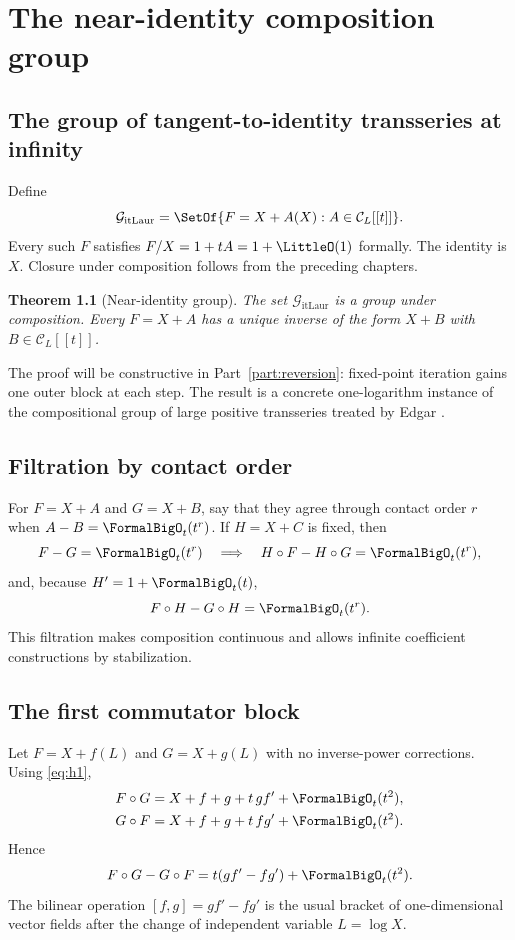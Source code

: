 \documentclass[11pt,oneside]{book}
\newtheorem{theorem}{Theorem}[chapter]
\theoremstyle{definition}
\theoremstyle{remark}
\newcommand{\compose}{\mathbin{\circ}}
\begin{document}
\chapter{The near-identity composition group}
\label{ch:composition-group}

\section{The group of tangent-to-identity transseries at infinity}
Define
\begin{equation}\label{eq:near-id-group}
 \mathcal G_{\mathrm{itLaur}}
 =\SetOf{F=X+A(X):A\in\mathcal C_L[[t]]}.
\end{equation}
Every such $F$ satisfies $F/X=1+tA=1+\LittleO(1)$ formally.  The identity is $X$.
Closure under composition follows from the preceding chapters.

\begin{theorem}[Near-identity group]\label{thm:near-id-group}
The set $\mathcal G_{\mathrm{itLaur}}$ is a group under composition.  Every
$F=X+A$ has a unique inverse of the form $X+B$ with
$B\in\mathcal C_L[[t]]$.
\end{theorem}
The proof will be constructive in Part~\ref{part:reversion}: fixed-point
iteration gains one outer block at each step.  The result is a concrete
one-logarithm instance of the compositional group of large positive
transseries treated by Edgar \cite{EdgarComposition}.

\section{Filtration by contact order}
For $F=X+A$ and $G=X+B$, say that they agree through contact order $r$ when
$A-B=\FormalBigO_t(t^r)$.  If $H=X+C$ is fixed, then
\begin{equation}\label{eq:composition-continuity-left}
 F-G=\FormalBigO_t(t^r)
 \quad\Longrightarrow\quad
 H\compose F-H\compose G=\FormalBigO_t(t^r),
\end{equation}
and, because $H'=1+\FormalBigO_t(t)$,
\begin{equation}\label{eq:composition-continuity-right}
 F\compose H-G\compose H=\FormalBigO_t(t^r).
\end{equation}
This filtration makes composition continuous and allows infinite coefficient
constructions by stabilization.

\section{The first commutator block}
Let $F=X+f(L)$ and $G=X+g(L)$ with no inverse-power corrections.  Using
\eqref{eq:h1},
\begin{align*}
 F\compose G&=X+f+g+t\,g f'+\FormalBigO_t(t^2),\\
 G\compose F&=X+f+g+t\,f g'+\FormalBigO_t(t^2).
\end{align*}
Hence
\begin{equation}\label{eq:first-commutator}
 F\compose G-G\compose F
 =t(gf'-fg')+\FormalBigO_t(t^2).
\end{equation}
The bilinear operation $[f,g]=gf'-fg'$ is the usual bracket of one-dimensional
vector fields after the change of independent variable $L=\log X$.
\end{document}
